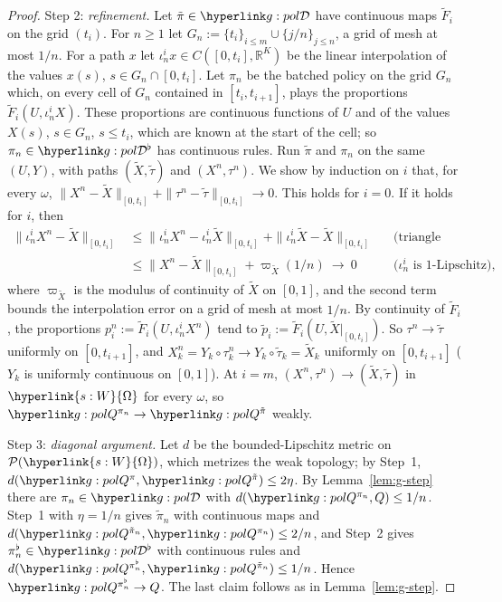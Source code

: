 \documentclass[11pt]{article}
\DeclareRobustCommand{\sy}[2]{{\hyperlink{#1}{#2}}}
\newcommand{\R}{\mathbb{R}}
\newcommand{\1}{\mathbf{1}}
\newcommand{\Om}{\sy{s:W}{\Omega}}
\begin{document}
\begin{proof}
Step 2: \emph{refinement.} Let $\tilde\pi\in\gDc$ have continuous maps $\tilde F_i$ on the grid $(t_i)$. For $n\ge1$ let $G_n:=\{t_i\}_{i\le m}\cup\{j/n\}_{j\le n}$, a grid of
mesh at most $1/n$. For a path $x$ let $\iota^i_nx\in C([0,t_i],\R^K)$ be the linear interpolation of the values $x(s)$, $s\in G_n\cap[0,t_i]$. Let $\pi_n$ be the batched
policy on the grid $G_n$ which, on every cell of $G_n$ contained in $[t_i,t_{i+1}]$, plays the proportions $\tilde F_i(U,\iota^i_nX)$. These proportions are continuous
functions of $U$ and of the values $X(s)$, $s\in G_n$, $s\le t_i$, which are known at the start of the cell; so $\pi_n\in\gBc$ has continuous rules. Run $\tilde\pi$ and $\pi_n$
on the same $(U,Y)$, with paths $(\tilde X,\tilde\tau)$ and $(X^n,\tau^n)$. We show by induction on $i$ that, for every $\omega$,
$\|X^n-\tilde X\|_{[0,t_i]}+\|\tau^n-\tilde\tau\|_{[0,t_i]}\to0$. This holds for $i=0$. If it holds for $i$, then
\begin{align*}
\|\iota^i_nX^n-\tilde X\|_{[0,t_i]}&\le\|\iota^i_nX^n-\iota^i_n\tilde X\|_{[0,t_i]}+\|\iota^i_n\tilde X-\tilde X\|_{[0,t_i]} &&\text{(triangle inequality)}\\
&\le\|X^n-\tilde X\|_{[0,t_i]}+\varpi_{\tilde X}(1/n)\ \longrightarrow\ 0 &&\text{(}\iota^i_n\text{ is }1\text{-Lipschitz)},
\end{align*}
where $\varpi_{\tilde X}$ is the modulus of continuity of $\tilde X$ on $[0,1]$, and the second term bounds the interpolation error on a grid of mesh at most $1/n$. By continuity of $\tilde F_i$, the proportions $p^n_i:=\tilde F_i(U,\iota^i_nX^n)$ tend to
$\tilde p_i:=\tilde F_i(U,\tilde X|_{[0,t_i]})$. So $\tau^n\to\tilde\tau$ uniformly on $[0,t_{i+1}]$, and $X^n_k=Y_k\circ\tau^n_k\to Y_k\circ\tilde\tau_k=\tilde X_k$ uniformly
on $[0,t_{i+1}]$ ($Y_k$ is uniformly continuous on $[0,1]$). At $i=m$, $(X^n,\tau^n)\to(\tilde X,\tilde\tau)$ in $\Om$ for every $\omega$, so
$\gQp{\pi_n}\to\gQp{\tilde\pi}$ weakly.

Step 3: \emph{diagonal argument.} Let $d$ be the bounded-Lipschitz metric on $\mathcal P(\Om)$, which metrizes the weak topology; by Step~1, $d(\gQp\pi,\gQp{\tilde\pi})\le2\eta$.
By Lemma~\ref{lem:g-step} there are $\pi_n\in\gDc$ with $d(\gQp{\pi_n},Q)\le1/n$. Step~1 with $\eta=1/n$ gives $\tilde\pi_n$ with continuous maps and
$d(\gQp{\tilde\pi_n},\gQp{\pi_n})\le2/n$, and Step~2 gives $\pi^\flat_n\in\gBc$ with continuous rules and $d(\gQp{\pi^\flat_n},\gQp{\tilde\pi_n})\le1/n$. Hence
$\gQp{\pi^\flat_n}\to Q$. The last claim follows as in Lemma~\ref{lem:g-step}.
\end{proof}
\end{document}
